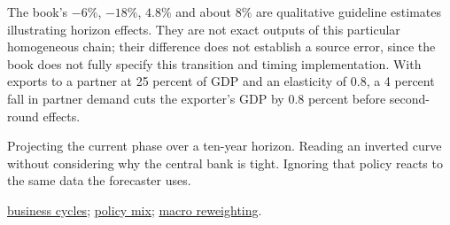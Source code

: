 \begin{qfmethod}
The book's $-6\%$, $-18\%$, $4.8\%$ and about $8\%$ are qualitative guideline estimates illustrating horizon effects. They are not exact outputs of this particular homogeneous chain; their difference does not establish a source error, since the book does not fully specify this transition and timing implementation. With exports to a partner at 25 percent of GDP and an elasticity of 0.8, a 4 percent fall in partner demand cuts the exporter's GDP by 0.8 percent before second-round effects.

 Projecting the current phase over a ten-year horizon. Reading an inverted curve without considering why the central bank is tight. Ignoring that policy reacts to the same data the forecaster uses.

 \hyperref[def:business-credit-cycles]{business cycles}; \hyperref[meth:monetary-fiscal-policy-mix]{policy mix}; \hyperref[ex:global-portfolio-macro-rebalancing]{macro reweighting}.

\end{qfmethod}

